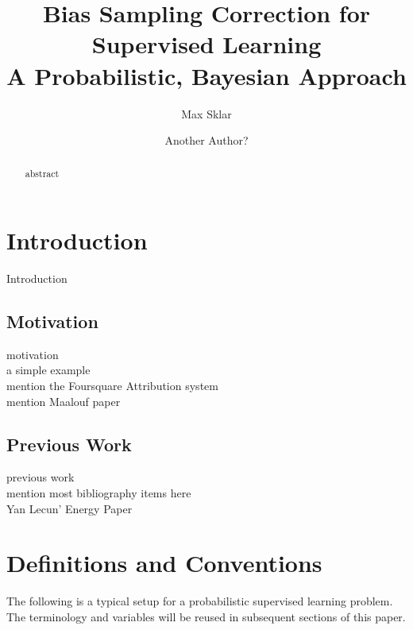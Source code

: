 \documentclass[twoside]{article}
\begin{document}
\parindent=0in
\parskip=12pt

%
%
%
%

\title{
  Bias Sampling Correction for Supervised Learning \\
  \large{
    A  Probabilistic, Bayesian Approach
  }
}

\author{Max Sklar\\
\and
Another Author?
}

\maketitle
\thispagestyle{empty}

\begin{abstract}
abstract
\end{abstract}

\section{Introduction}

Introduction

\subsection{Motivation}

motivation \\
a simple example \\
mention the Foursquare Attribution system \\
mention Maalouf paper

\subsection{Previous Work}

previous work \\
mention most bibliography items here \\
Yan Lecun' Energy Paper \\


\section{Definitions and Conventions}

The following is a typical setup for a probabilistic supervised learning problem. The terminology and variables will be reused in subsequent sections of this paper.
\end{document}
